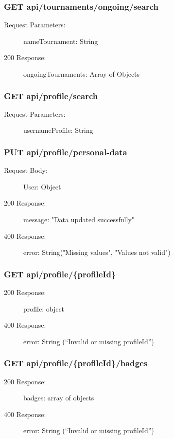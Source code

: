 \documentclass{Configuration_Files/Template}
\begin{document}
\subsubsection{GET api/tournaments/ongoing/search}
\begin{description}
    \item[Request Parameters:] nameTournament: String
    \item[200 Response:] ongoingTournaments: Array of Objects
\end{description}

\subsubsection{GET api/profile/search}
\begin{description}
    \item[Request Parameters:] usernameProfile: String
\end{description}

\subsubsection{PUT api/profile/personal-data}
\begin{description}
    \item[Request Body:] User: Object
    \item[200 Response:] message: "Data updated successfully"
    \item[400 Response:] error: String("Missing values", "Values not valid")
\end{description}

\subsubsection{GET api/profile/\{profileId\}}
\begin{description}
    \item[200 Response:] profile: object
    \item[400 Response:] error: String (“Invalid or missing profileId”)
\end{description}

\subsubsection{GET api/profile/\{profileId\}/badges}
\begin{description}
    \item[200 Response:] badges: array of objects
    \item[400 Response:] error: String (“Invalid or missing profileId”)
\end{description}
\end{document}
